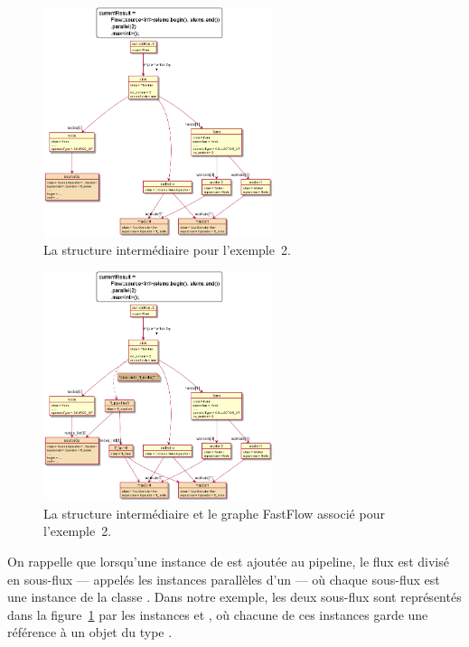 \begin{figure}
\centering
         \includegraphics[width=0.6\textwidth]{Figures/objets2-ppff.png}
      \caption{La structure interm\'ediaire  pour l'exemple~2.}
       \label{objets2-ppff.fig}
\end{figure}

\begin{figure}
\centering
         \includegraphics[width=0.6\textwidth]{Figures/objets2-ff.png}
      \caption{La structure interm\'ediaire  et le graphe FastFlow associ\'e pour l'exemple~2.}
       \label{objets2-ff.fig}

\end{figure}



On rappelle que lorsqu'une instance de  est ajout\'ee au {pipeline}, le flux est divis\'e en sous-flux --- appel\'es les instances parall\`eles d'un  --- o\`u chaque sous-flux est une instance de la classe . Dans notre exemple, les deux sous-flux sont représent\'es dans la figure~\ref{objets2-ppff.fig} par les instances  et , o\`u chacune de ces instances garde une r\'ef\'erence \`a un objet du type . 


